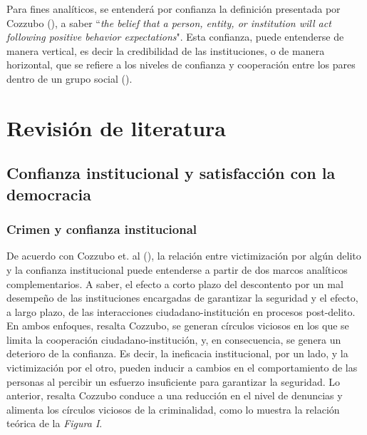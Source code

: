 \documentclass[letterpaper]{article}
\begin{document}
Para fines analíticos, se entenderá por confianza la definición presentada por Cozzubo (\citeyear{cozzubo2021}), a saber ``\emph{the belief that a person, entity, or institution will act following positive behavior expectations}". Esta confianza, puede entenderse de manera vertical, es decir la credibilidad de las instituciones, o de manera horizontal, que se refiere a los niveles de confianza y cooperación entre los pares dentro de un grupo social (\citeyear{cozzubo2021}).

\vspace{-0.4cm}

\section{Revisión de literatura}

\subsection{Confianza institucional y satisfacción con la democracia}

\subsubsection{Crimen y confianza institucional}

De acuerdo con Cozzubo et. al (\citeyear{cozzubo2021}), la relación entre victimización por algún delito y la confianza institucional puede entenderse a partir de dos marcos analíticos complementarios. A saber, el efecto a corto plazo del descontento por un mal desempeño de las instituciones encargadas de garantizar la seguridad y el efecto, a largo plazo, de las interacciones ciudadano-institución en procesos post-delito. En ambos enfoques, resalta Cozzubo, se generan círculos viciosos en los que se limita la cooperación ciudadano-institución, y, en consecuencia, se genera un deterioro de la confianza. Es decir, la ineficacia institucional, por un lado, y la victimización por el otro, pueden inducir a cambios en el comportamiento de las personas al percibir un esfuerzo insuficiente para garantizar la seguridad. Lo anterior, resalta Cozzubo conduce a una reducción en el nivel de denuncias y alimenta los círculos viciosos de la criminalidad, como lo muestra la relación teórica de la \emph{Figura I}.\\[-1.5em]
\end{document}
